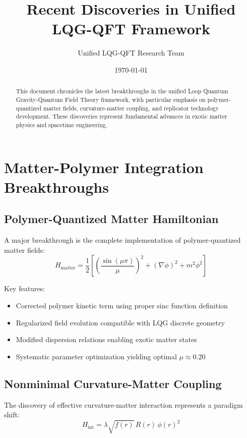\documentclass[11pt]{article}
\title{Recent Discoveries in Unified LQG-QFT Framework}
\author{Unified LQG-QFT Research Team}
\date{\today}
\begin{document}
\maketitle

\begin{abstract}
This document chronicles the latest breakthroughs in the unified Loop Quantum Gravity-Quantum Field Theory framework, with particular emphasis on polymer-quantized matter fields, curvature-matter coupling, and replicator technology development. These discoveries represent fundamental advances in exotic matter physics and spacetime engineering.
\end{abstract}

\section{Matter-Polymer Integration Breakthroughs}

\subsection{Polymer-Quantized Matter Hamiltonian}

A major breakthrough is the complete implementation of polymer-quantized matter fields:
\begin{equation}
H_{\text{matter}} = \frac{1}{2}\left[\left(\frac{\sin(\mu\pi)}{\mu}\right)^2 + (\nabla\phi)^2 + m^2\phi^2\right]
\end{equation}

Key features:
\begin{itemize}
\item Corrected polymer kinetic term using proper sinc function definition
\item Regularized field evolution compatible with LQG discrete geometry
\item Modified dispersion relations enabling exotic matter states
\item Systematic parameter optimization yielding optimal $\mu \approx 0.20$
\end{itemize}

\subsection{Nonminimal Curvature-Matter Coupling}

The discovery of effective curvature-matter interaction represents a paradigm shift:
\begin{equation}
H_{\text{int}} = \lambda\sqrt{f(r)}\,R(r)\,\phi(r)^2
\end{equation}
\end{document}
